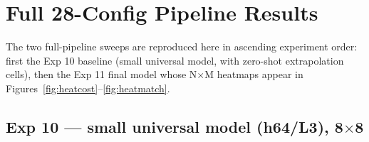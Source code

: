 \documentclass[11pt,a4paper]{article}
\begin{document}
\section{Full 28-Config Pipeline Results}

The two full-pipeline sweeps are reproduced here in ascending experiment order: first the
Exp 10 baseline (small universal model, with zero-shot extrapolation cells), then the Exp 11
final model whose N$\times$M heatmaps appear in Figures~\ref{fig:heatcost}--\ref{fig:heatmatch}.

\subsection{Exp 10 --- small universal model (h64/L3), 8$\times$8}
\end{document}
